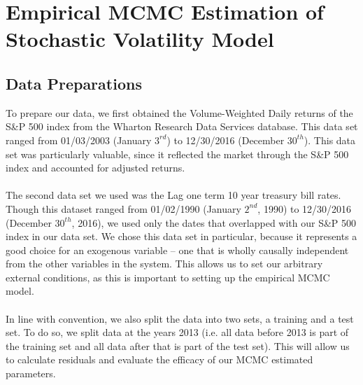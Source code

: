 \documentclass[letterpaper]{article}
\begin{document}
	\section{Empirical MCMC Estimation of Stochastic Volatility Model}
	\subsection{Data Preparations}
	To prepare our data, we first obtained the Volume-Weighted Daily returns of the S\&P 500 index from the Wharton Research Data Services database. This data set ranged from 01/03/2003 (January $3^{rd}$) to 12/30/2016 (December $30^{th}$). This data set was particularly valuable, since it reflected the market through the S\&P 500 index and accounted for adjusted returns.\\\\
	The second data set we used was the Lag one term 10 year treasury bill rates. Though this dataset ranged from 01/02/1990 (January $2^{nd}$, 1990) to 12/30/2016 (December $30^{th}$, 2016), we used only the dates that overlapped with our S\&P 500 index in our data set. We chose this data set in particular, because it represents a good choice for an exogenous variable -- one that is wholly causally independent from the other variables in the system. This allows us to set our arbitrary external conditions, as this is important to setting up the empirical MCMC model. \\\\
	In line with convention, we also split the data into two sets, a training and a test set. To do so, we split data at the years 2013 (i.e. all data before 2013 is part of the training set and all data after that is part of the test set). This will allow us to calculate residuals and evaluate the efficacy of our MCMC estimated parameters.
\end{document}
